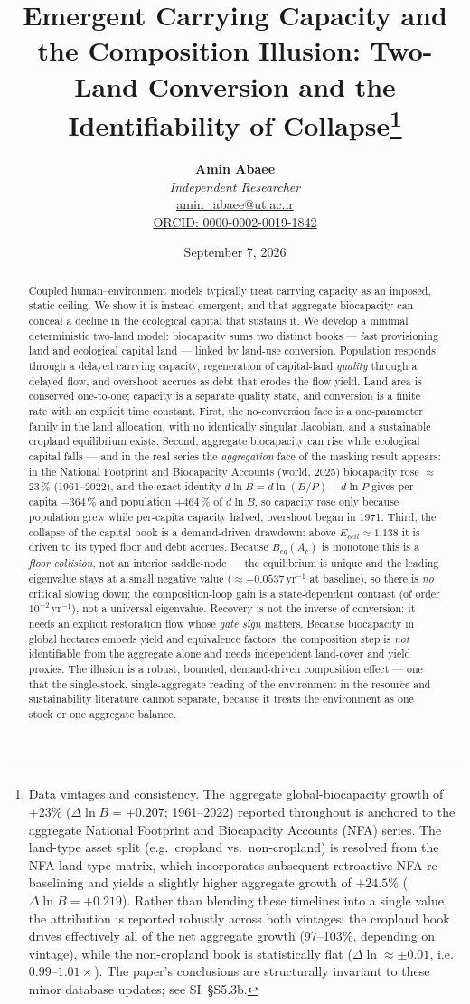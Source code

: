 \documentclass[11pt]{article}
\title{Emergent Carrying Capacity and the Composition Illusion: Two-Land Conversion and the Identifiability of Collapse\thanks{Data vintages and consistency. The aggregate global-biocapacity growth of $+23\%$ ($\Delta\ln B=+0.207$; 1961--2022) reported throughout is anchored to the aggregate National Footprint and Biocapacity Accounts (NFA) series. The land-type asset split (e.g.\ cropland vs.\ non-cropland) is resolved from the NFA land-type matrix, which incorporates subsequent retroactive NFA re-baselining and yields a slightly higher aggregate growth of $+24.5\%$ ($\Delta\ln B=+0.219$). Rather than blending these timelines into a single value, the attribution is reported robustly across both vintages: the cropland book drives effectively all of the net aggregate growth (\raisebox{0pt}{$\approx$}97--103\%, depending on vintage), while the non-cropland book is statistically flat ($\Delta\ln\approx\pm0.01$, i.e.\ $0.99$--$1.01\times$). The paper's conclusions are structurally invariant to these minor database updates; see SI~§S5.3b.}}
\author{
  \textbf{Amin Abaee}\\
  \textit{Independent Researcher}\\
  \href{mailto:amin_abaee@ut.ac.ir}{amin\_abaee@ut.ac.ir}\\
  \href{https://orcid.org/0000-0002-0019-1842}{ORCID: 0000-0002-0019-1842}
}
\date{September 7, 2026}
\begin{document}
\maketitle

\begin{abstract}
Coupled human--environment models typically treat carrying capacity as an imposed, static ceiling. We show it is instead emergent, and that aggregate biocapacity can conceal a decline in the ecological capital that sustains it. We develop a minimal deterministic two-land model: biocapacity sums two distinct books --- fast provisioning land and ecological capital land --- linked by land-use conversion. Population responds through a delayed carrying capacity, regeneration of capital-land \emph{quality} through a delayed flow, and overshoot accrues as debt that erodes the flow yield. Land area is conserved one-to-one; capacity is a separate quality state, and conversion is a finite rate with an explicit time constant. First, the no-conversion face is a one-parameter family in the land allocation, with no identically singular Jacobian, and a sustainable cropland equilibrium exists. Second, aggregate biocapacity can rise while ecological capital falls --- and in the real series the \emph{aggregation} face of the masking result appears: in the National Footprint and Biocapacity Accounts (world, 2025) biocapacity rose $\approx$23\,\% (1961--2022), and the exact identity $d\ln B=d\ln(B/P)+d\ln P$ gives per-capita $-364$\,\% and population $+464$\,\% of $d\ln B$, so capacity rose only because population grew while per-capita capacity halved; overshoot began in 1971. Third, the collapse of the capital book is a demand-driven drawdown: above $E_{ceil}\approx1.138$ it is driven to its typed floor and debt accrues. Because $B_{eq}(A_c)$ is monotone this is a \emph{floor collision}, not an interior saddle-node --- the equilibrium is unique and the leading eigenvalue stays at a small negative value ($\approx-0.0537\,\text{yr}^{-1}$ at baseline), so there is \emph{no} critical slowing down; the composition-loop gain is a state-dependent contrast (of order $10^{-2}\,$yr$^{-1}$), not a universal eigenvalue. Recovery is not the inverse of conversion: it needs an explicit restoration flow whose \emph{gate sign} matters. Because biocapacity in global hectares embeds yield and equivalence factors, the composition step is \emph{not} identifiable from the aggregate alone and needs independent land-cover and yield proxies. The illusion is a robust, bounded, demand-driven composition effect --- one that the single-stock, single-aggregate reading of the environment in the resource and sustainability literature cannot separate, because it treats the environment as one stock or one aggregate balance.
\end{abstract}
\end{document}
